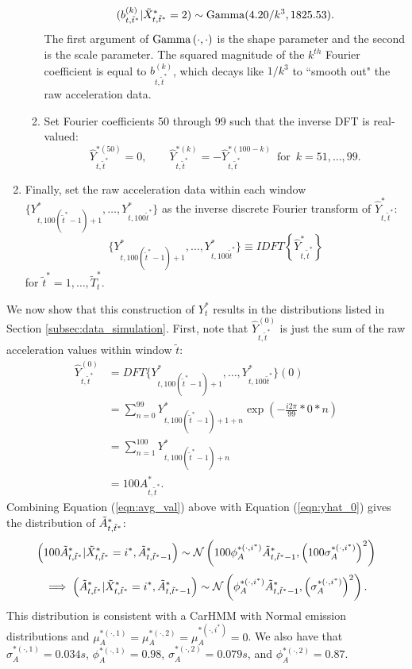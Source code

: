 \begin{enumerate}
\begin{enumerate}
\begin{align}
\begin{split}
    	(b^{(k)}_{t,\tilde t^*}|\tilde X^*_{t,\tilde t^*} = 2) &\sim {\rm{Gamma}}(4.20/k^3, 1825.53). \\ 
    \end{split}
    \label{eqn:bdist}
    \end{align}
    The first argument of ${\rm{Gamma}}\left(\cdot,\cdot\right)$ is the shape parameter and the second is the scale parameter. The squared magnitude of the $k^{th}$ Fourier coefficient is equal to $b^{(k)}_{t,\tilde t^*}$, which decays like $1/k^3$ to ``smooth out" the raw acceleration data.
    \item Set Fourier coefficients 50 through 99 such that the inverse DFT is real-valued:
    $$
    \hat{Y}^{*(50)}_{t,\tilde t^*} = 0, \qquad
	\hat{Y}^{*(k)}_{t,\tilde t^*} = -\hat{Y}^{*(100-k)}_{t,\tilde t^*} \enspace \text{for} \enspace k = 51,\ldots,99.
    $$
    \end{enumerate}
    \item Finally, set the raw acceleration data within each window $\{Y^*_{t,100(\tilde t^* - 1) + 1},\ldots,Y^*_{t,100\tilde t^*}\}$ as the inverse discrete Fourier transform of $\hat{Y}^*_{t,\tilde t^*}$:
    $$\{Y^*_{t,100(\tilde t^* - 1) + 1},\ldots,Y^*_{t,100\tilde t^*}\} \equiv IDFT\left\{\hat{Y}^*_{t,\tilde t^*}\right\}$$
    for $\tilde t^* = 1,\ldots,\tilde T^*_t.$
\end{enumerate}

We now show that this construction of $Y^*_t$ results in the distributions listed in Section \ref{subsec:data_simulation}. First, note that $\hat{Y}^{(0)}_{t,\tilde t^*}$ is just the sum of the raw acceleration values within window $\tilde t$:
%
\begin{align}
    \hat{Y}^{(0)}_{t,\tilde t^*} &=
    DFT\{Y^*_{t,100(\tilde t^* - 1) + 1},\ldots,Y^*_{t,100\tilde t^*}\}(0) \nonumber \\
    &= \sum_{n=0}^{99} Y^*_{t,100(\tilde t^* - 1) + 1 + n} \exp\left(-\frac{i2\pi}{99}*0*n\right) \nonumber \\
    &= \sum_{n=1}^{100} Y^*_{t,100(\tilde t^* - 1) + n} \nonumber \\
    &= 100A^*_{t,\tilde t^*}.
    \label{eqn:avg_val}
\end{align}
%
Combining Equation (\ref{eqn:avg_val}) above with Equation (\ref{eqn:yhat_0}) gives the distribution of $\tilde{A}^*_{t,\tilde t^*}$: 
%
$$\left(100\tilde{A}^*_{t,\tilde t^*} | \tilde X^*_{t,\tilde t^*} = i^*, \tilde{A}^*_{t,\tilde t^*-1} \right) \sim \mathcal{N} \left(100\phi_A^{*(\cdot,i^*)} \tilde{A}^*_{t,\tilde t^*-1}, \left(100\sigma_A^{*(\cdot,i^*)}\right)^2 \right)$$
%
$$\implies \left(\tilde{A}^*_{t,\tilde t^*} | \tilde X^*_{t,\tilde t^*} = i^*, \tilde{A}^*_{t,\tilde t^*-1} \right) \sim \mathcal{N} \left(\phi_A^{*(\cdot,i^*)} \tilde{A}^*_{t,\tilde t^*-1}, \left(\sigma_A^{*(\cdot,i^*)}\right)^2 \right).$$
%
This distribution is consistent with a CarHMM with Normal emission distributions and $\mu_A^{*(\cdot,1)} = \mu_A^{*(\cdot,2)} = \mu_A^{*(\cdot,i^*)} = 0$. We also have that $\sigma_A^{*(\cdot,1)} = 0.034s$, $\phi_A^{*(\cdot,1)} = 0.98$, $\sigma_A^{*(\cdot,2)} = 0.079s$, and $\phi_A^{*(\cdot,2)} = 0.87$.

